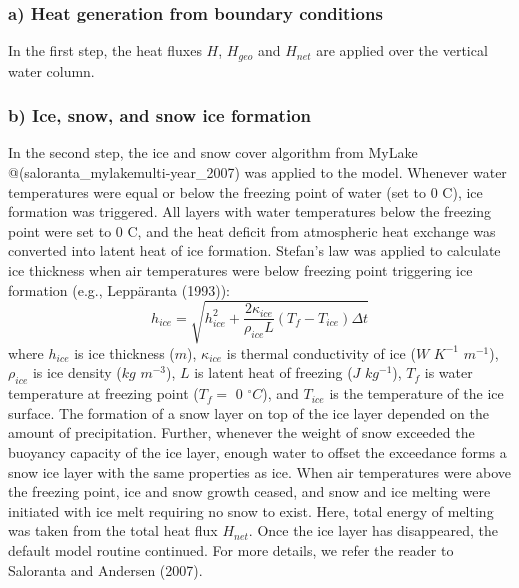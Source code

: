 \documentclass[
  letterpaper,
  DIV=11,
  numbers=noendperiod]{scrartcl}
\begin{document}
\hypertarget{a-heat-generation-from-boundary-conditions}{%
\subsubsection{a) Heat generation from boundary
conditions}\label{a-heat-generation-from-boundary-conditions}}

In the first step, the heat fluxes \(H\), \(H_{geo}\) and \(H_{net}\)
are applied over the vertical water column.

\hypertarget{b-ice-snow-and-snow-ice-formation}{%
\subsubsection{b) Ice, snow, and snow ice
formation}\label{b-ice-snow-and-snow-ice-formation}}

In the second step, the ice and snow cover algorithm from MyLake
@(saloranta\_mylakemulti-year\_2007) was applied to the model. Whenever
water temperatures were equal or below the freezing point of water (set
to 0 \textdegree C), ice formation was triggered. All layers with water
temperatures below the freezing point were set to 0 \textdegree C, and
the heat deficit from atmospheric heat exchange was converted into
latent heat of ice formation. Stefan's law was applied to calculate ice
thickness when air temperatures were below freezing point triggering ice
formation (e.g., Leppäranta (1993)): \[
     h_{ice}=\sqrt{h_{ice}^2+\frac{2 \kappa_{ice}}{\rho_{ice}L}(T_f-T_{ice})\Delta t}
\] where \(h_{ice}\) is ice thickness (\(m\)), \(\kappa_{ice}\) is
thermal conductivity of ice (\(W\) \(K^{-1}\) \(m^{-1}\)),
\(\rho_{ice}\) is ice density (\(kg\) \(m^{-3}\)), \(L\) is latent heat
of freezing (\(J\) \(kg^{-1}\)), \(T_f\) is water temperature at
freezing point (\(T_f =\) 0 \(^\circ C\)), and \(T_{ice}\) is the
temperature of the ice surface. The formation of a snow layer on top of
the ice layer depended on the amount of precipitation. Further, whenever
the weight of snow exceeded the buoyancy capacity of the ice layer,
enough water to offset the exceedance forms a snow ice layer with the
same properties as ice. When air temperatures were above the freezing
point, ice and snow growth ceased, and snow and ice melting were
initiated with ice melt requiring no snow to exist. Here, total energy
of melting was taken from the total heat flux \(H_{net}\). Once the ice
layer has disappeared, the default model routine continued. For more
details, we refer the reader to Saloranta and Andersen (2007).
\end{document}

